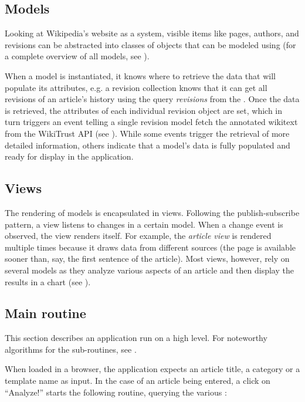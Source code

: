 \subsection{Models}

Looking at Wikipedia's website as a system, visible items like pages, authors, and revisions can be abstracted into classes of objects that can be modeled using  (for a complete overview of  all models, see ).

When a model is instantiated, it knows where to retrieve the data that will populate its attributes, e.g. a revision collection knows that it can get all revisions of an article's history using the query \emph{revisions} from the  .
Once the data is retrieved, the attributes of each individual revision object are set, which in turn triggers an event telling a single revision model fetch the annotated wikitext from the WikiTrust \ac{API} (see ).
While some events trigger the retrieval of more detailed information, others indicate that a model's data is fully populated and ready for display in the application.

\subsection{Views}

The rendering of models is encapsulated in views.
Following the publish-subscribe pattern, a view listens to changes in a certain model.
When a change event is observed, the view renders itself.
For example, the \emph{article view} is rendered multiple times because it draws data from different sources (the page  is available sooner than, say, the first sentence of the article). 
Most views, however, rely on several models as they analyze various aspects of an article and then display the results in a chart (see ).

\subsection{Main routine}

This section describes an application run on a high level.
For noteworthy algorithms for the sub-routines, see .

When loaded in a browser, the application expects an article title, a category or a template name as input.
In the case of an article being entered, a click on ``Analyze!'' starts the following routine, querying the various :

